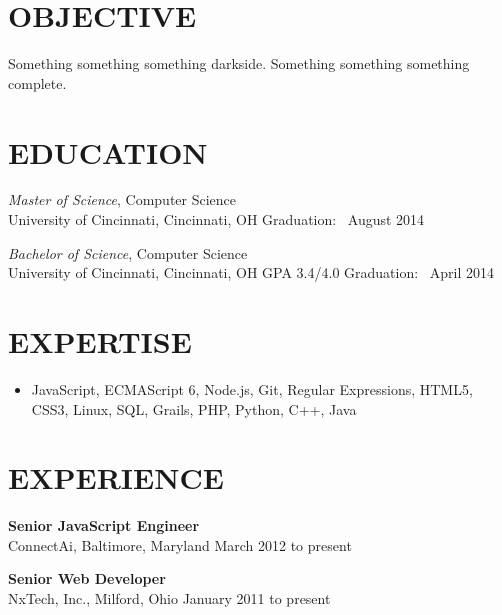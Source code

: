\documentclass[11pt, line]{res}
\begin{document}
	\address{
			8228 Melrose Ln\\ Maineville, OH 45039\\ (513) 259-0656\\ ross@rhadden.com
	}

	\begin{resume}
		\section{OBJECTIVE}
			Something something something darkside.  Something something something complete.

		\section{EDUCATION}
			\textit{Master of Science},
				Computer Science \\
				University of Cincinnati, Cincinnati, OH
				\hfill
					Graduation: \ August 2014

			\textit{Bachelor of Science},
				Computer Science \\
				University of Cincinnati, Cincinnati, OH
				\hspace{16pt}
					GPA 3.4/4.0
				\hfill
					Graduation: \ April 2014

		\section{EXPERTISE}
			\begin{itemize}[leftmargin=0pt]
				\item[]
					JavaScript,
					ECMAScript 6,
					Node.js,
					Git,
					Regular Expressions,
					HTML5,
					CSS3,
					Linux,
					SQL,
					Grails,
					PHP,
					Python,
					C++,
					Java
			\end{itemize}

		\section{EXPERIENCE}
			\textbf{Senior JavaScript Engineer} \\
			ConnectAi,\; Baltimore, Maryland
			\hfill March 2012 to present

			\textbf{Senior Web Developer} \\
			NxTech, Inc.,\; Milford, Ohio
			\hfill January 2011 to present
	\end{resume}
\end{document}
